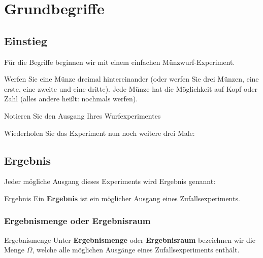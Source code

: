 \section{Grundbegriffe}




\subsection*{Einstieg}
Für die Begriffe beginnen wir mit einem einfachen Münzwurf-Experiment.

Werfen Sie eine Münze dreimal hintereinander (oder werfen Sie drei
Münzen, eine erste, eine zweite und eine dritte). Jede Münze hat die
Möglichkeit auf Kopf oder Zahl (alles andere heißt: nochmals werfen).

Notieren Sie den Ausgang Ihres Wurfexperimentes


\TRAINER{\vspace{24mm}}

Wiederholen Sie das Experiment nun noch weitere drei Male:



\newpage

\subsection{Ergebnis}

Jeder mögliche Ausgang dieses Experiments wird Ergebnis genannt:

\begin{definition}{Ergebnis}{}
Ein \textbf{Ergebnis} ist ein möglicher Ausgang eines
Zufallsexperiments.
\end{definition}


\subsubsection{Ergebnismenge oder Ergebnisraum}\label{ergebnisraum}

\begin{definition}{Ergebnismenge}{}
  Unter \textbf{Ergebnismenge} oder \textbf{Ergebnisraum} bezeichnen
  wir die Menge $\Omega$, welche alle möglichen Ausgänge eines
  Zufallsexperiments enthält.
\end{definition}


